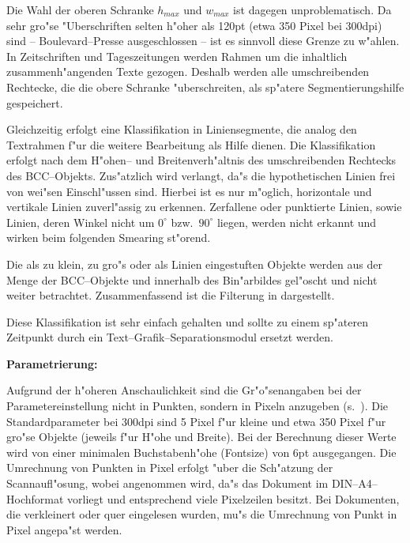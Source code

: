 Die Wahl der oberen Schranke $h_{max}$ und $w_{max}$ ist dagegen unproblematisch.
Da sehr gro"se "Uberschriften
selten h"oher als 120pt (etwa 350 Pixel bei 300dpi) sind -- Boulevard--Presse ausgeschlossen --
ist es sinnvoll diese Grenze zu w"ahlen.
In Zeitschriften und Tages\-zeit\-ungen werden Rahmen um die
inhaltlich zusammenh"angenden Texte gezogen. Deshalb werden alle umschreibenden
Rechtecke, die die obere Schranke "uberschreiten, als sp"atere Segmentierungshilfe gespeichert.


Gleichzeitig erfolgt eine Klassifikation in Liniensegmente, die
analog den Textrahmen f"ur die weitere Bearbeitung als Hilfe dienen. Die Klassifikation erfolgt
nach dem H"ohen-- und Breitenverh"altnis des umschreibenden Rechtecks des BCC--Objekts.
Zus"atzlich wird verlangt, da"s die hypothetischen Linien
frei von wei"sen Einschl"ussen sind. Hierbei ist es nur m"oglich, horizontale und vertikale Linien
zuverl"assig zu erkennen. Zerfallene oder punktierte Linien, sowie Linien, deren Winkel nicht um
$0^\circ$ bzw.\ $90^\circ$ liegen, werden nicht erkannt und wirken beim folgenden
Smearing st"orend.

Die als zu klein, zu gro"s oder als Linien eingestuften Objekte werden aus der Menge der
BCC--Objekte und innerhalb des Bin"arbildes gel"oscht und nicht weiter betrachtet.
Zusammenfassend ist die Filterung in  dargestellt.

Diese Klassifikation ist sehr einfach gehalten und sollte zu einem sp"ateren Zeitpunkt durch ein
Text--Grafik--Separationsmodul ersetzt werden.

  {\bf Parametrierung:}

Aufgrund der h"oheren Anschaulichkeit sind die Gr"o"senangaben bei der Parametereinstellung
nicht in Punkten,
sondern in Pixeln anzugeben (s.\ ).
Die Standardparameter bei 300dpi sind 5 Pixel
f"ur kleine und etwa 350 Pixel f"ur gro"se Objekte (jeweils f"ur H"ohe und Breite).
Bei der Berechnung dieser Werte wird von einer minimalen Buchstabenh"ohe (Fontsize) von 6pt
ausgegangen. Die Umrechnung von Punkten in Pixel erfolgt "uber die Sch"atzung der
Scannaufl"osung, wobei angenommen wird, da"s das Dokument im DIN--A4--Hochformat vorliegt
und entsprechend viele Pixelzeilen besitzt. Bei Dokumenten, die verkleinert oder
quer eingelesen wurden, mu"s die Umrechnung von Punkt in Pixel angepa"st werden.


